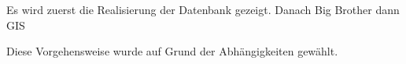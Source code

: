 Es wird zuerst die Realisierung der Datenbank gezeigt. Danach Big Brother dann GIS

Diese Vorgehensweise wurde auf Grund der Abhängigkeiten gewählt.